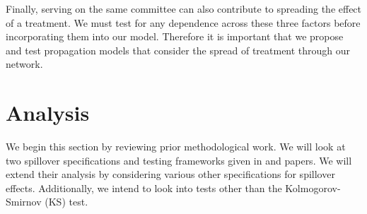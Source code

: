 \documentclass[12pt]{article}
\begin{document}
Finally, serving on the same committee can also contribute to spreading the effect of a treatment. We must test for any dependence across these three factors before incorporating them into our model. Therefore it is important that we propose and test propagation models that consider the spread of treatment through our network.




\section{Analysis}

We begin this section by reviewing prior methodological work. We will look at two spillover specifications and testing frameworks given in \citet{bowers2012reasoning} and \citet{coppock2014information} papers. We will extend their analysis by considering various other specifications for spillover effects. Additionally, we intend to look into tests other than the Kolmogorov-Smirnov (KS) test.
\end{document}
